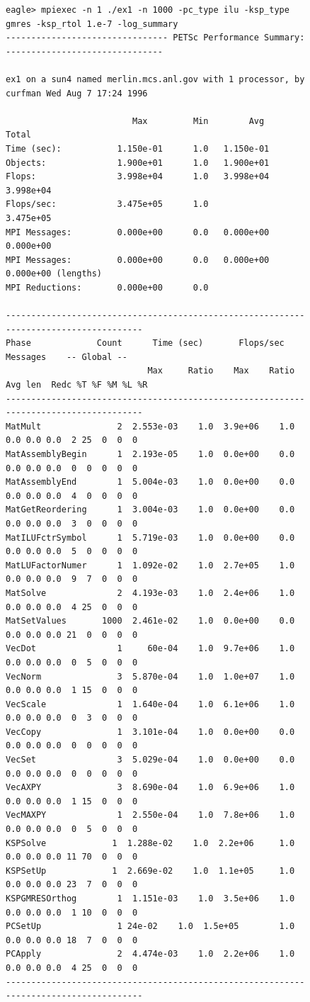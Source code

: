 \begin{figure}[H]
{\footnotesize
\begin{verbatim}
eagle> mpiexec -n 1 ./ex1 -n 1000 -pc_type ilu -ksp_type gmres -ksp_rtol 1.e-7 -log_summary
-------------------------------- PETSc Performance Summary: -------------------------------

ex1 on a sun4 named merlin.mcs.anl.gov with 1 processor, by curfman Wed Aug 7 17:24 1996

                         Max         Min        Avg        Total 
Time (sec):           1.150e-01      1.0   1.150e-01
Objects:              1.900e+01      1.0   1.900e+01
Flops:                3.998e+04      1.0   3.998e+04  3.998e+04
Flops/sec:            3.475e+05      1.0              3.475e+05
MPI Messages:         0.000e+00      0.0   0.000e+00  0.000e+00
MPI Messages:         0.000e+00      0.0   0.000e+00  0.000e+00 (lengths)
MPI Reductions:       0.000e+00      0.0

--------------------------------------------------------------------------------------
Phase             Count      Time (sec)       Flops/sec     Messages    -- Global --    
                            Max     Ratio    Max    Ratio Avg len  Redc %T %F %M %L %R   
--------------------------------------------------------------------------------------
MatMult               2  2.553e-03    1.0  3.9e+06    1.0  0.0 0.0 0.0  2 25  0  0  0
MatAssemblyBegin      1  2.193e-05    1.0  0.0e+00    0.0  0.0 0.0 0.0  0  0  0  0  0
MatAssemblyEnd        1  5.004e-03    1.0  0.0e+00    0.0  0.0 0.0 0.0  4  0  0  0  0
MatGetReordering      1  3.004e-03    1.0  0.0e+00    0.0  0.0 0.0 0.0  3  0  0  0  0
MatILUFctrSymbol      1  5.719e-03    1.0  0.0e+00    0.0  0.0 0.0 0.0  5  0  0  0  0
MatLUFactorNumer      1  1.092e-02    1.0  2.7e+05    1.0  0.0 0.0 0.0  9  7  0  0  0
MatSolve              2  4.193e-03    1.0  2.4e+06    1.0  0.0 0.0 0.0  4 25  0  0  0
MatSetValues       1000  2.461e-02    1.0  0.0e+00    0.0  0.0 0.0 0.0 21  0  0  0  0
VecDot                1     60e-04    1.0  9.7e+06    1.0  0.0 0.0 0.0  0  5  0  0  0
VecNorm               3  5.870e-04    1.0  1.0e+07    1.0  0.0 0.0 0.0  1 15  0  0  0
VecScale              1  1.640e-04    1.0  6.1e+06    1.0  0.0 0.0 0.0  0  3  0  0  0
VecCopy               1  3.101e-04    1.0  0.0e+00    0.0  0.0 0.0 0.0  0  0  0  0  0
VecSet                3  5.029e-04    1.0  0.0e+00    0.0  0.0 0.0 0.0  0  0  0  0  0
VecAXPY               3  8.690e-04    1.0  6.9e+06    1.0  0.0 0.0 0.0  1 15  0  0  0
VecMAXPY              1  2.550e-04    1.0  7.8e+06    1.0  0.0 0.0 0.0  0  5  0  0  0
KSPSolve             1  1.288e-02    1.0  2.2e+06     1.0  0.0 0.0 0.0 11 70  0  0  0
KSPSetUp             1  2.669e-02    1.0  1.1e+05     1.0  0.0 0.0 0.0 23  7  0  0  0
KSPGMRESOrthog        1  1.151e-03    1.0  3.5e+06    1.0  0.0 0.0 0.0  1 10  0  0  0
PCSetUp               1 24e-02    1.0  1.5e+05        1.0  0.0 0.0 0.0 18  7  0  0  0
PCApply               2  4.474e-03    1.0  2.2e+06    1.0  0.0 0.0 0.0  4 25  0  0  0
--------------------------------------------------------------------------------------


\end{verbatim}}
\end{figure}
